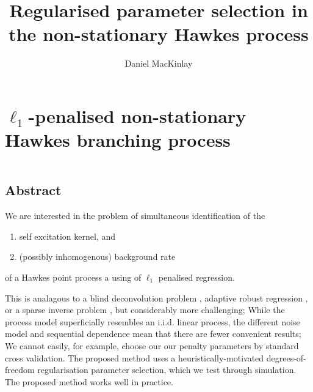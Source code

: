 \documentclass[11pt]{article}
\title{Regularised parameter selection in the non-stationary Hawkes process}
\author{Daniel MacKinlay}
\providecommand{\tightlist}{%
      \setlength{\itemsep}{0pt}\setlength{\parskip}{0pt}}
\newcommand{\var}{\operatorname{Var}}
\newcommand{\dd}{\mathrm{d}}
\newcommand{\bb}[1]{\mathbb{#1}}
\renewcommand{\bf}[1]{\mathbf{#1}}
\renewcommand{\v}[1]{\boldsymbol{#1}}
\newcommand{\m}[1]{\mathrm{#1}}
\newcommand{\cc}[1]{\mathcal{#1}}
\renewcommand{\cc}[1]{\mathcal{#1}}
\newcommand{\oo}[1]{\operatorname{#1}}
\begin{document}
    
    
    \maketitle
    
    

    
    \section{\texorpdfstring{\(\ell_1\)-penalised non-stationary Hawkes
branching
process}{\textbackslash{}ell\_1-penalised non-stationary Hawkes branching process}}\label{ell_1-penalised-non-stationary-hawkes-branching-process}





    \[
\renewcommand{\var}{\operatorname{Var}}
\renewcommand{\dd}{\mathrm{d}}
\renewcommand{\bb}[1]{\mathbb{#1}}
\renewcommand{\bf}[1]{\mathbf{#1}}
\renewcommand{\v}[1]{\boldsymbol{#1}}
\renewcommand{\m}[1]{\mathrm{#1}}
\renewcommand{\cc}[1]{\mathcal{#1}}
\renewcommand{\cc}[1]{\mathcal{#1}}
\renewcommand{\oo}[1]{\operatorname{#1}}
\]

    \subsection{Abstract}\label{abstract}

We are interested in the problem of simultaneous identification of the

\begin{enumerate}
\def\labelenumi{\arabic{enumi}.}
\tightlist
\item
  self excitation kernel, and
\item
  (possibly inhomogenous) background rate
\end{enumerate}

of a Hawkes point process a using of \(\ell_1\) penalised regression.

This is analagous to a blind deconvolution problem
\cite{stockham_blind_1975}, adaptive robust regression
\cite{donoho_automatic_1988}, or a sparse inverse problem
\cite{tibshirani_regression_1996}, but considerably more challenging;
While the process model superficially resembles an i.i.d. linear
process, the different noise model and sequential dependence mean that
there are fewer convenient results; We cannot easily, for example,
choose our our penalty parameters by standard cross validation. The
proposed method uses a heuristically-motivated degrees-of-freedom
regularisation parameter selection, which we test through simulation.
The proposed method works well in practice.
\end{document}
